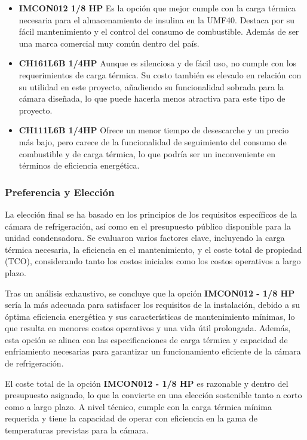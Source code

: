  \begin{itemize}
 	\item \textbf{IMCON012 1/8 HP} Es la opción que mejor cumple con la carga térmica necesaria para el almacenamiento de insulina en la UMF40. Destaca por su fácil mantenimiento y el control del consumo de combustible. Además de ser una marca comercial muy común dentro del país.
 	\item \textbf{CH161L6B 1/4HP} Aunque es silenciosa y de fácil uso, no cumple con los requerimientos de carga térmica. Su costo también es elevado en relación con su utilidad en este proyecto, añadiendo su funcionalidad sobrada para la cámara diseñada, lo que puede hacerla menos atractiva para este tipo de proyecto.
 	\item \textbf{CH111L6B 1/4HP} Ofrece un menor tiempo de desescarche y un precio más bajo, pero carece de la funcionalidad de seguimiento del consumo de combustible y de carga térmica, lo que podría ser un inconveniente en términos de eficiencia energética.
 \end{itemize}
 
 \subsubsection{Preferencia y Elección}
La elección final se ha basado en los principios de los requisitos específicos de la cámara de refrigeración, así como en el presupuesto público disponible para la unidad condensadora. Se evaluaron varios factores clave, incluyendo la carga térmica necesaria, la eficiencia en el mantenimiento, y el coste total de propiedad (TCO), considerando tanto los costos iniciales como los costos operativos a largo plazo.

Tras un análisis exhaustivo, se concluye que la opción \textbf{IMCON012 - 1/8 HP} sería la más adecuada para satisfacer los requisitos de la instalación, debido a su óptima eficiencia energética y sus características de mantenimiento mínimas, lo que resulta en menores costos operativos y una vida útil prolongada. Además, esta opción se alinea con las especificaciones de carga térmica y capacidad de enfriamiento necesarias para garantizar un funcionamiento eficiente de la cámara de refrigeración.

El coste total de la opción \textbf{IMCON012 - 1/8 HP} es razonable y dentro del presupuesto asignado, lo que la convierte en una elección sostenible tanto a corto como a largo plazo. A nivel técnico, cumple con la carga térmica mínima requerida y tiene la capacidad de operar con eficiencia en la gama de temperaturas previstas para la cámara.

